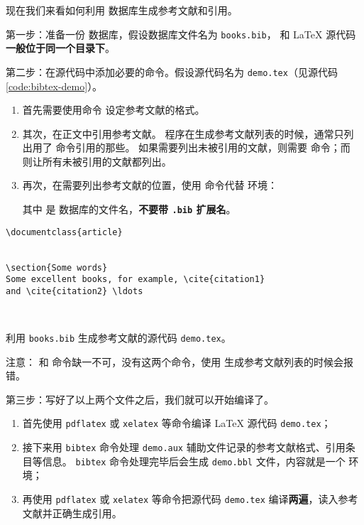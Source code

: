 现在我们来看如何利用  数据库生成参考文献和引用。

第一步：准备一份  数据库，假设数据库文件名为 \texttt{books.bib}，
和 \LaTeX{} 源代码\textbf{一般位于同一个目录下}。

第二步：在源代码中添加必要的命令。假设源代码名为 \texttt{demo.tex}（见源代码 \ref{code:bibtex-demo}）。
\begin{enumerate}
\item {}
首先需要使用命令  设定参考文献的格式。

\item {}
其次，在正文中引用参考文献。 程序在生成参考文献列表的时候，通常只列出用了  命令引用的那些。
如果需要列出未被引用的文献，则需要  命令；而 \marg*{*} 则让所有未被引用的文献都列出。

\item {}
再次，在需要列出参考文献的位置，使用  命令代替  环境：
\begin{command}
\end{command}

其中  是  数据库的文件名，\textbf{不要带 \texttt{.bib} 扩展名}。
\end{enumerate}

\begin{sourcecode}[htp]
\begin{Verbatim}
\documentclass{article}


\section{Some words}
Some excellent books, for example, \cite{citation1}
and \cite{citation2} \ldots



\end{Verbatim}
\caption{利用 \texttt{books.bib} 生成参考文献的源代码 \texttt{demo.tex}。}\label{code:bibtex-demo}
\end{sourcecode}

注意： 和  命令缺一不可，没有这两个命令，使用  生成参考文献列表的时候会报错。

第三步：写好了以上两个文件之后，我们就可以开始编译了。
\begin{enumerate}
  \item 首先使用 \texttt{pdflatex} 或 \texttt{xelatex} 等命令编译 \LaTeX{} 源代码 \texttt{demo.tex}；
  \item 接下来用 \texttt{bibtex} 命令处理 \texttt{demo.aux} 辅助文件记录的参考文献格式、引用条目等信息。
  \texttt{bibtex} 命令处理完毕后会生成 \texttt{demo.bbl} 文件，内容就是一个  环境；
  \item 再使用 \texttt{pdflatex} 或 \texttt{xelatex} 等命令把源代码 \texttt{demo.tex} 编译\textbf{两遍}，读入参考文献并正确生成引用。
\end{enumerate}

